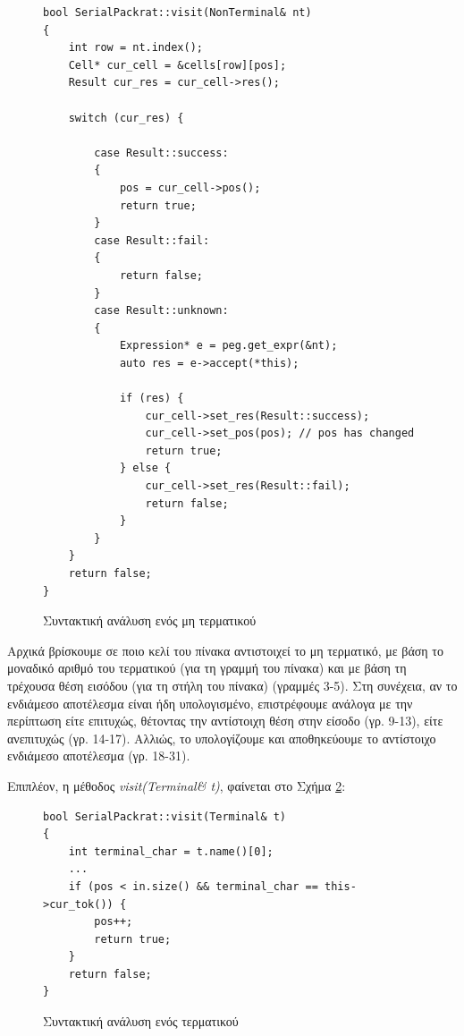 \begin{figure}[h]
\setlength\partopsep{-\topsep}%
\begin{verbatim}
bool SerialPackrat::visit(NonTerminal& nt)
{
    int row = nt.index();
    Cell* cur_cell = &cells[row][pos];
    Result cur_res = cur_cell->res();

    switch (cur_res) {

        case Result::success:
        {
            pos = cur_cell->pos();
            return true;
        }
        case Result::fail:
        {
            return false;
        }
        case Result::unknown:
        {
            Expression* e = peg.get_expr(&nt);
            auto res = e->accept(*this);

            if (res) {
                cur_cell->set_res(Result::success);
                cur_cell->set_pos(pos); // pos has changed
                return true;
            } else {
                cur_cell->set_res(Result::fail);
                return false;
            }
        }
    }
    return false;
}
\end{verbatim}
  \caption{Συντακτική ανάλυση ενός μη τερματικού}
  \label{fig:visit_nt}
\end{figure}

Αρχικά βρίσκουμε σε ποιο κελί του πίνακα αντιστοιχεί το μη τερματικό, με βάση το μοναδικό αριθμό του τερματικού (για τη γραμμή του πίνακα) και με βάση τη τρέχουσα θέση εισόδου (για τη στήλη του πίνακα) (γραμμές 3-5).
Στη συνέχεια, αν το ενδιάμεσο αποτέλεσμα είναι ήδη υπολογισμένο, επιστρέφουμε ανάλογα με την περίπτωση είτε επιτυχώς, θέτοντας την αντίστοιχη θέση στην είσοδο (γρ. 9-13), είτε ανεπιτυχώς (γρ. 14-17).
Αλλιώς, το υπολογίζουμε και αποθηκεύουμε το αντίστοιχο ενδιάμεσο αποτέλεσμα (γρ. 18-31).

Επιπλέον, η μέθοδος \textit{visit(Terminal\& t)}, φαίνεται στο Σχήμα \ref{fig:visit_t}:

\begin{figure}[h]
\setlength\partopsep{-\topsep}%
\begin{verbatim}
bool SerialPackrat::visit(Terminal& t)
{
    int terminal_char = t.name()[0];
    ...
    if (pos < in.size() && terminal_char == this->cur_tok()) {
        pos++;
        return true;
    }
    return false;
}
\end{verbatim}
  \caption{Συντακτική ανάλυση ενός τερματικού}
  \label{fig:visit_t}
\end{figure}

